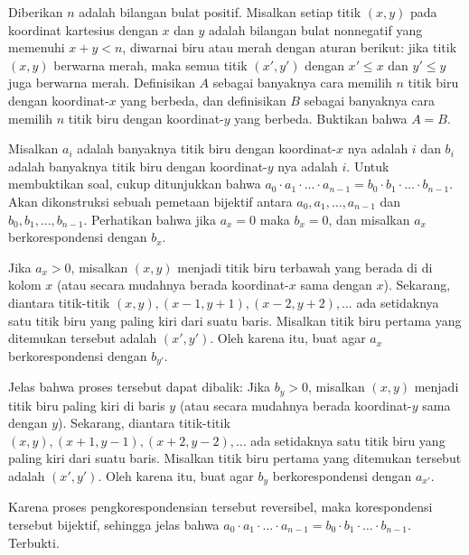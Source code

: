 \documentclass[12pt]{scrartcl}
\begin{document}
\begin{soaljawab}
    Diberikan $n$ adalah bilangan bulat positif. Misalkan setiap titik $(x,y)$ pada koordinat kartesius dengan $x$ dan $y$ adalah bilangan bulat nonnegatif yang memenuhi $x+y < n$, diwarnai biru atau merah dengan aturan berikut: jika titik $(x,y)$ berwarna merah, maka semua titik $(x',y')$ dengan $x' \le x$ dan $y' \le y$ juga berwarna merah. Definisikan $A$ sebagai banyaknya cara memilih $n$ titik biru dengan koordinat-$x$ yang berbeda, dan definisikan $B$ sebagai banyaknya cara memilih $n$ titik biru dengan koordinat-$y$ yang berbeda. Buktikan bahwa $A=B$.
    \begin{solusi}
        Misalkan $a_i$ adalah banyaknya titik biru dengan koordinat-$x$ nya adalah $i$ dan $b_i$ adalah banyaknya titik biru dengan koordinat-$y$ nya adalah $i$. Untuk membuktikan soal, cukup ditunjukkan bahwa $a_0\cdot a_1 \cdot \ldots \cdot a_{n-1} = b_0 \cdot b_1 \cdot \ldots \cdot b_{n-1}$. Akan dikonstruksi sebuah pemetaan bijektif antara $a_0, a_1, \dots, a_{n-1}$ dan $b_0, b_1, \dots, b_{n-1}$. Perhatikan bahwa jika $a_x = 0$ maka $b_x = 0$, dan misalkan $a_x$ berkorespondensi dengan $b_x$. 
        
        Jika $a_x > 0$, misalkan $(x,y)$ menjadi titik biru terbawah yang berada di di kolom $x$ (atau secara mudahnya berada koordinat-$x$ sama dengan $x$). Sekarang, diantara titik-titik $(x,y),(x-1,y+1),(x-2,y+2),\dots$ ada setidaknya satu titik biru yang paling kiri dari suatu baris. Misalkan titik biru pertama yang ditemukan tersebut adalah $(x',y')$. Oleh karena itu, buat agar $a_x$ berkorespondensi dengan $b_{y'}$.

        Jelas bahwa proses tersebut dapat dibalik: Jika $b_y > 0$, misalkan $(x,y)$ menjadi titik biru paling kiri di baris $y$ (atau secara mudahnya berada koordinat-$y$ sama dengan $y$). Sekarang, diantara titik-titik $(x,y),(x+1,y-1),(x+2,y-2),\dots$ ada setidaknya satu titik biru yang paling kiri dari suatu baris. Misalkan titik biru pertama yang ditemukan tersebut adalah $(x',y')$. Oleh karena itu, buat agar $b_y$ berkorespondensi dengan $a_{x'}$.

        Karena proses pengkorespondensian tersebut reversibel, maka korespondensi tersebut bijektif, sehingga jelas bahwa $a_0\cdot a_1 \cdot \ldots \cdot a_{n-1} = b_0 \cdot b_1 \cdot \ldots \cdot b_{n-1}$. Terbukti.
    \end{solusi}
\end{soaljawab}
\end{document}
